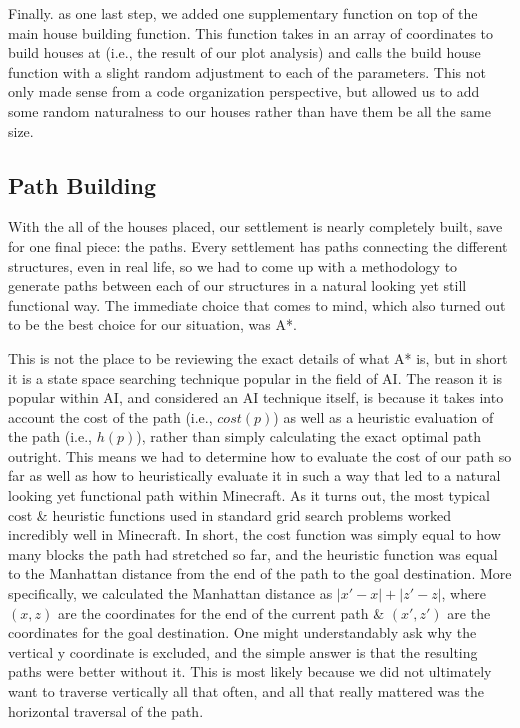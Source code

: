 \documentclass[11pt, oneside]{article}
\begin{document}
\begin{normalsize}
Finally. as one last step, we added one supplementary function on top of the main house building function. 
This function takes in an array of coordinates to build houses at (i.e., the result of our plot analysis) and calls the build house function with a slight random adjustment to each of the parameters. 
This not only made sense from a code organization perspective, but allowed us to add some random naturalness to our houses rather than have them be all the same size. 

\subsection{Path Building}

With the all of the houses placed, our settlement is nearly completely built, save for one final piece: the paths. 
Every settlement has paths connecting the different structures, even in real life, so we had to come up with a methodology to generate paths between each of our structures in a natural looking yet still functional way. 
The immediate choice that comes to mind, which also turned out to be the best choice for our situation, was A*.  

This is not the place to be reviewing the exact details of what A* is, but in short it is a state space searching technique popular in the field of AI. 
The reason it is popular within AI, and considered an AI technique itself, is because it takes into account the cost of the path (i.e., $cost(p)$) as well as a heuristic evaluation of the path (i.e., $h(p)$), rather than simply calculating the exact optimal path outright. 
This means we had to determine how to evaluate the cost of our path so far as well as how to heuristically evaluate it in such a way that led to a natural looking yet functional path within Minecraft. 
As it turns out, the most typical cost \& heuristic functions used in standard grid search problems worked incredibly well in Minecraft. 
In short, the cost function was simply equal to how many blocks the path had stretched so far, and the heuristic function was equal to the Manhattan distance from the end of the path to the goal destination.
More specifically, we calculated the Manhattan distance as $|x' - x| + |z' - z|$, where $(x, z)$ are the coordinates for the end of the current path \& $(x', z')$ are the coordinates for the goal destination.
One might understandably ask why the vertical y coordinate is excluded, and the simple answer is that the resulting paths were better without it. 
This is most likely because we did not ultimately want to traverse vertically all that often, and all that really mattered was the horizontal traversal of the path. 


\end{normalsize}
\end{document}

